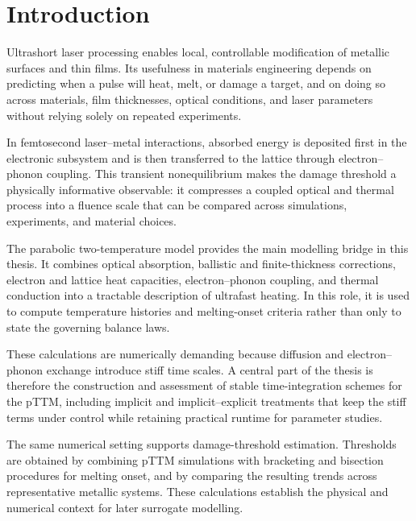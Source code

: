 \chapter*{Introduction}

Ultrashort laser processing enables local, controllable modification of metallic surfaces and thin films. Its usefulness in materials engineering depends on predicting when a pulse will heat, melt, or damage a target, and on doing so across materials, film thicknesses, optical conditions, and laser parameters without relying solely on repeated experiments.

In femtosecond laser--metal interactions, absorbed energy is deposited first in the electronic subsystem and is then transferred to the lattice through electron--phonon coupling. This transient nonequilibrium makes the damage threshold a physically informative observable: it compresses a coupled optical and thermal process into a fluence scale that can be compared across simulations, experiments, and material choices.

The parabolic two-temperature model provides the main modelling bridge in this thesis. It combines optical absorption, ballistic and finite-thickness corrections, electron and lattice heat capacities, electron--phonon coupling, and thermal conduction into a tractable description of ultrafast heating. In this role, it is used to compute temperature histories and melting-onset criteria rather than only to state the governing balance laws.

These calculations are numerically demanding because diffusion and electron--phonon exchange introduce stiff time scales. A central part of the thesis is therefore the construction and assessment of stable time-integration schemes for the pTTM, including implicit and implicit--explicit treatments that keep the stiff terms under control while retaining practical runtime for parameter studies.

The same numerical setting supports damage-threshold estimation. Thresholds are obtained by combining pTTM simulations with bracketing and bisection procedures for melting onset, and by comparing the resulting trends across representative metallic systems. These calculations establish the physical and numerical context for later surrogate modelling.


